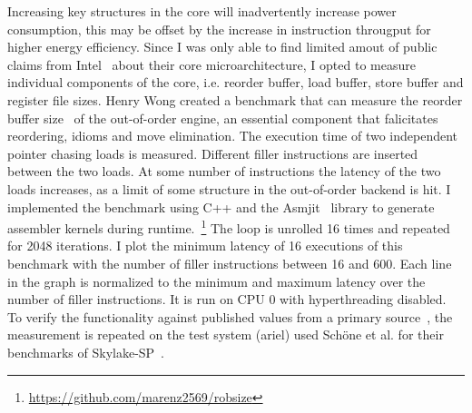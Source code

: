 Increasing key structures in the core will inadvertently increase power consumption, this may be offset by the increase in instruction througput for higher energy efficiency.
Since I was only able to find limited amout of public claims from Intel~\cite{Intel_2021_Architecture_Day} about their core microarchitecture, I opted to measure individual components of the core, i.e. reorder buffer, load buffer, store buffer and register file sizes.
Henry Wong created a benchmark that can measure the reorder buffer size~\cite{Wong_2013_robsize} of the out-of-order engine, an essential component that falicitates reordering, idioms and move elimination.
The execution time of two independent pointer chasing loads is measured.
Different filler instructions are inserted between the two loads.
At some number of instructions the latency of the two loads increases, as a limit of some structure in the out-of-order backend is hit.
I implemented the benchmark using C++ and the Asmjit~\cite{Kobalicek_AsmJit} library to generate assembler kernels during runtime.~\footnote{\url{https://github.com/marenz2569/robsize}}
The loop is unrolled \SI{16}{} times and repeated for \SI{2048}{} iterations.
I plot the minimum latency of \SI{16}{} executions of this benchmark with the number of filler instructions between \SI{16}{} and \SI{600}{}.
Each line in the graph is normalized to the minimum and maximum latency over the number of filler instructions.
It is run on CPU 0 with hyperthreading disabled.
To verify the functionality against published values from a primary source~\cite{Intel_2017_Skylake_SP}, the measurement is repeated on the test system (ariel) used Schöne et al. for their benchmarks of Skylake-SP~\cite{Schoene_2019_SKL}.

